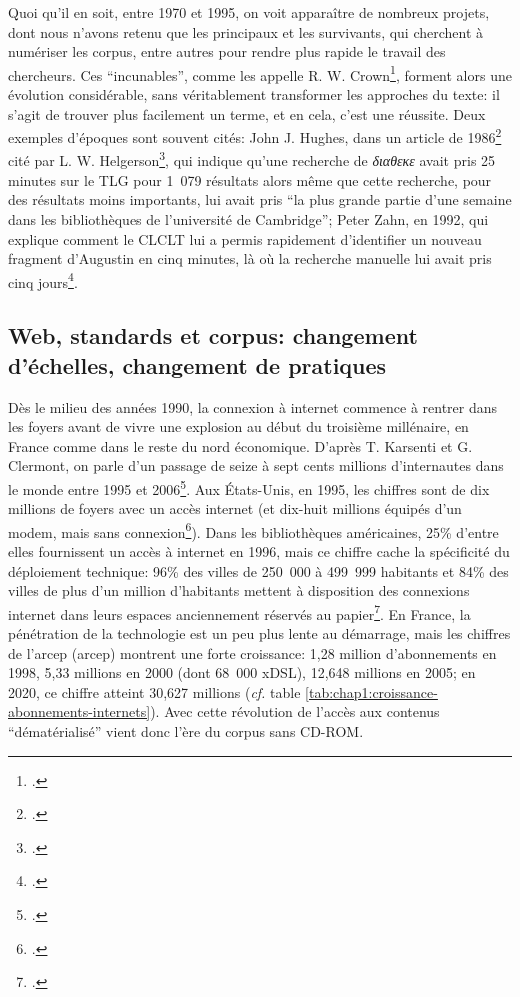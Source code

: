 Quoi qu'il en soit, entre 1970 et 1995, on voit apparaître de nombreux projets, dont nous n'avons retenu que les principaux et les survivants, qui cherchent à numériser les corpus, entre autres pour rendre plus rapide le travail des chercheurs. Ces \enquote{incunables}, comme les appelle R. W. Crown\footcite[p.~107]{crown_comparing_2000}, forment alors une évolution considérable, sans véritablement transformer les approches du texte: il s'agit de trouver plus facilement un terme, et en cela, c'est une réussite. Deux exemples d'époques sont souvent cités: John J. Hughes, dans un article de 1986\footcite{hughes_ibycus_1986} cité par L. W. Helgerson\footcite{helgerson_cd-rom_1988}, qui indique qu'une recherche de \textit{\textgreek{διαθεκε}} avait pris 25 minutes sur le TLG pour 1~079 résultats alors même que cette recherche, pour des résultats moins importants, lui avait pris \enquote{la plus grande partie d'une semaine dans les bibliothèques de l'université de Cambridge}; Peter Zahn, en 1992, qui explique comment le CLCLT lui a permis rapidement d'identifier un nouveau fragment d'Augustin en cinq minutes, là où la recherche manuelle lui avait pris cinq jours\footcite[p. 427]{zahn_kirchenvater-texte_1992}.

\subsection{Web, standards et corpus: changement d'échelles, changement de pratiques}

Dès le milieu des années 1990, la connexion à internet commence à rentrer dans les foyers avant de vivre une explosion au début du troisième millénaire, en France comme dans le reste du nord économique. D'après T. Karsenti et G. Clermont, on parle d'un passage de seize à sept cents millions d'internautes dans le monde entre 1995 et 2006\footcite{karsenti_les_2006}. Aux États-Unis, en 1995, les chiffres sont de dix millions de foyers avec un accès internet (et dix-huit millions équipés d'un modem, mais sans connexion\footcite{nw_americans_1995}). Dans les bibliothèques américaines, 25\% d'entre elles fournissent un accès à internet en 1996, mais ce chiffre cache la spécificité du déploiement technique: 96\% des villes de 250~000 à 499~999 habitants et 84\% des villes de plus d'un million d'habitants mettent à disposition des connexions internet dans leurs espaces anciennement réservés au papier\footcite{zumalt_internet_1998}. En France, la pénétration de la technologie est un peu plus lente au démarrage, mais les chiffres de l'\acrfull{arcep} (\acrshort{arcep}) montrent une forte croissance: 1,28 million d'abonnements en 1998, 5,33 millions en 2000 (dont 68~000 xDSL), 12,648 millions en 2005; en 2020, ce chiffre atteint 30,627 millions (\textit{cf.} table \ref{tab:chap1:croissance-abonnements-internets}). Avec cette révolution de l'accès aux contenus \enquote{dématérialisé} vient donc l'ère du corpus sans CD-ROM.

